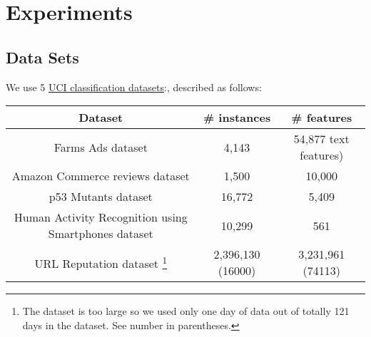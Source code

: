 \section{Experiments}
\label{sec:experiments}

\subsection{Data Sets}


We use 5 \href{http://archive.ics.uci.edu/ml/datasets.html}{UCI classification
datasets}:, described as follows:

\begin{tabular}{| c | c |  c |}
\hline
Dataset & \# instances & \# features \\
\hline
Farms Ads dataset & 4,143 & 54,877 text features)\\
\hline
Amazon Commerce reviews dataset & 1,500 & 10,000 \\
\hline
p53 Mutants dataset & 16,772 & 5,409 \\
\hline
Human Activity Recognition using Smartphones dataset & 10,299 & 561\\
\hline
URL Reputation dataset \footnote{The dataset is too large so we used only one day of data out of totally 121 days in the dataset. See number in parentheses.} & 2,396,130 (16000) & 3,231,961 (74113) \\
\hline
\end{tabular}

